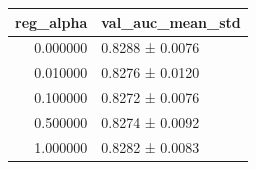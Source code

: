 \begin{tabular}{rl}
\toprule
reg_alpha & val_auc_mean_std \\
\midrule
0.000000 & 0.8288 ± 0.0076 \\
0.010000 & 0.8276 ± 0.0120 \\
0.100000 & 0.8272 ± 0.0076 \\
0.500000 & 0.8274 ± 0.0092 \\
1.000000 & 0.8282 ± 0.0083 \\
\bottomrule
\end{tabular}
